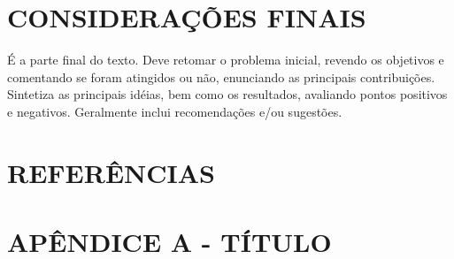 \documentclass[
	12pt,				%
	oneside,			%
	a4paper,			%
	english,			%
	french,				%
	spanish,			%
	brazil,				%
	]{abntex2}
\theoremstyle{plain}
\theoremstyle{definition}
\begin{document}
%	
%
%
%
%
%

\chapter*[Conclusão]{CONSIDERAÇÕES FINAIS}

É a parte final do texto. Deve retomar o problema inicial, revendo os objetivos
e comentando se foram atingidos ou não, enunciando as principais contribuições.
Sintetiza as principais idéias, bem como os resultados, avaliando pontos positivos e
negativos. Geralmente inclui recomendações e/ou sugestões. 

	\chapter*[Referências]{REFERÊNCIAS}




%







\chapter*[Apêndice]{APÊNDICE A - TÍTULO}
\end{document}
